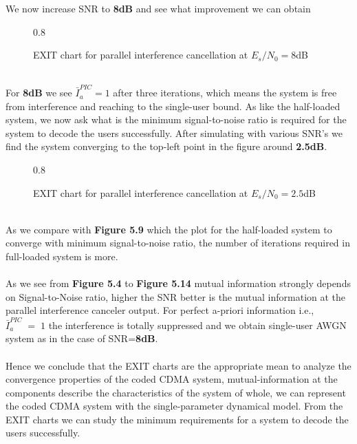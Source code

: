 We now increase SNR to \textbf{8dB} and see what improvement we can obtain 
\begin{figure*}[htb]
\centerline{  {0.8}}
\caption{EXIT chart for parallel interference cancellation at $E_s/N_0=8$dB }
\end{figure*}\\
For \textbf{8dB} we see $\bar{I}_a^{PIC}=1$ after three iterations, which means the system is free from interference and reaching to the single-user bound.
\newpage
As like the half-loaded system, we now ask what is the minimum signal-to-noise ratio is required for the system to decode the users successfully. After simulating with various SNR's we find the system converging to the top-left point in the figure around \textbf{2.5dB}.
\begin{figure*}[htb]
\centerline{  {0.8}}
\caption{EXIT chart for parallel interference cancellation at $E_s/N_0=2.5$dB }
\end{figure*}\\
As we compare with \textbf{Figure 5.9} which the plot for the half-loaded system to converge with minimum signal-to-noise ratio, the number of iterations required in full-loaded system is more. \\ \\
As we see from \textbf{Figure 5.4} to \textbf{Figure 5.14} mutual information strongly depends on Signal-to-Noise ratio, higher the SNR better is the mutual information at the parallel interference canceler output. For perfect a-priori information i.e., $\bar{I}_a^{PIC}\;=\;1$ the interference is totally suppressed and we obtain single-user AWGN system as in the case of SNR=\textbf{8dB}.\\ \\
Hence we conclude that the EXIT charts are the appropriate mean to analyze the convergence properties of the coded CDMA system, mutual-information at the components describe the characteristics of the system of whole, we can represent the coded CDMA system with the single-parameter dynamical model. From the EXIT charts we can study the minimum requirements for a system to decode the users successfully.
\newpage
